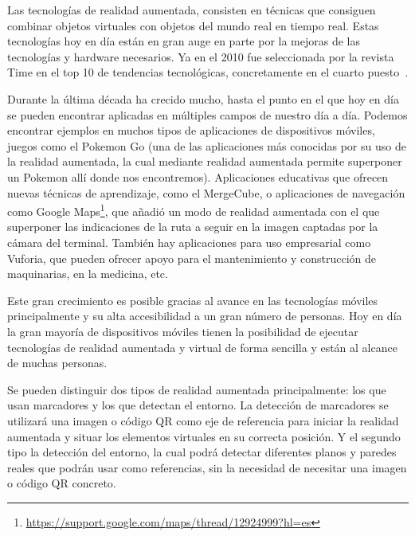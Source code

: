 
Las tecnologías de realidad aumentada, consisten en técnicas que consiguen combinar objetos virtuales con objetos del mundo real en tiempo real. 
Estas tecnologías hoy en día están en gran auge en parte por la mejoras de las tecnologías y hardware necesarios. Ya en el 2010 fue seleccionada por la revista Time en el top 10 de tendencias tecnológicas, concretamente en el cuarto puesto~\cite{fletcher_2010}. 

Durante la última década ha crecido mucho, hasta el punto en el que hoy en día se pueden encontrar aplicadas en múltiples campos de nuestro día a día. Podemos encontrar ejemplos en muchos tipos de aplicaciones de dispositivos móviles, juegos como el Pokemon Go (una de las aplicaciones más conocidas por su uso de la realidad aumentada, la cual mediante realidad aumentada permite superponer un Pokemon allí donde nos encontremos). Aplicaciones educativas que ofrecen nuevas técnicas de aprendizaje, como el MergeCube, o aplicaciones de navegación como Google Maps\footnote{\url{https://support.google.com/maps/thread/12924999?hl=es}}, que añadió un modo de realidad aumentada con el que superponer las indicaciones de la ruta a seguir en la imagen captadas por la cámara del terminal. También hay aplicaciones para uso empresarial como Vuforia, que pueden ofrecer apoyo para el mantenimiento y construcción de maquinarias, en la medicina, etc.


Este gran crecimiento es posible gracias al avance en las tecnologías móviles principalmente y su alta accesibilidad a un gran número de personas. Hoy en día la gran mayoría de dispositivos móviles tienen la posibilidad de ejecutar tecnologías de realidad aumentada y virtual de forma sencilla y están al alcance de muchas personas.

Se pueden distinguir dos tipos de realidad aumentada principalmente: los que usan marcadores y los que detectan el entorno. La detección de marcadores se utilizará una imagen o código QR como eje de referencia para iniciar la realidad aumentada y situar los elementos virtuales en su correcta posición. 
Y el segundo tipo la detección del entorno, la cual podrá detectar diferentes planos y paredes reales que podrán usar como referencias, sin la necesidad de necesitar una imagen o código QR concreto.



